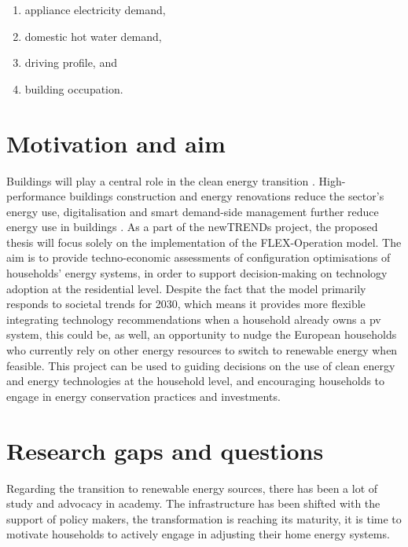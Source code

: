 \begin{enumerate}
  \item appliance electricity demand,
  \item domestic hot water demand,
  \item driving profile, and
  \item building occupation.
\end{enumerate}




\section{Motivation and aim}




Buildings will play a central role in the clean energy transition \cite{building}.
High-performance buildings construction and energy renovations reduce the sector’s energy use, digitalisation and smart demand-side management further reduce energy use in buildings \cite{building}.  
As a part of the newTRENDs project, 
the proposed thesis will focus solely on 
the implementation of the FLEX-Operation model.  
The aim is to provide techno-economic assessments 
of configuration optimisations of households' energy systems, 
in order to support decision-making on technology adoption at the residential level. 
Despite the fact that the model primarily responds to societal trends for 2030, 
which means it provides more flexible integrating technology recommendations when a household already owns a \gls{pv} system, 
this could be, as well, an opportunity to nudge the European households who currently rely on other energy resources
to switch to renewable energy when feasible. 
This project can be used to 
guiding decisions on the use of clean energy and energy technologies at the household level, 
and encouraging households to engage in energy conservation practices and investments. 


\section{Research gaps and questions}


Regarding the transition to renewable energy sources, 
there has been a lot of study and advocacy in academy. 
The infrastructure has been shifted with the support of policy makers, 
the transformation is reaching its maturity, 
it is time to motivate households to actively engage in adjusting their home energy systems.

